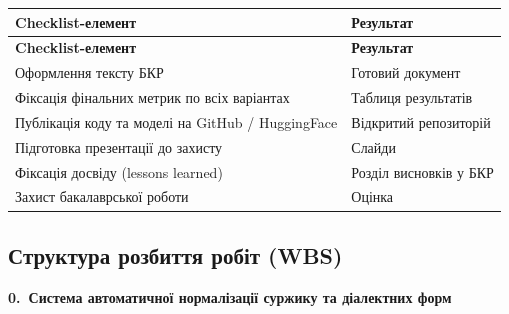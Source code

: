 \documentclass[14pt]{extarticle}
\newcommand{\tabhead}[1]{\textbf{#1}}
\begin{document}
\begin{longtable}{|p{}|p{}|}
\hline
\tabhead{Checklist-елемент} & \tabhead{Результат} \\
\hline
\endfirsthead
\hline
\tabhead{Checklist-елемент} & \tabhead{Результат} \\
\hline
\endhead
Оформлення тексту БКР & Готовий документ \\
\hline
Фіксація фінальних метрик по всіх варіантах & Таблиця результатів \\
\hline
Публікація коду та моделі на GitHub / HuggingFace & Відкритий репозиторій \\
\hline
Підготовка презентації до захисту & Слайди \\
\hline
Фіксація досвіду (lessons learned) & Розділ висновків у БКР \\
\hline
Захист бакалаврської роботи & Оцінка \\
\hline
\end{longtable}

\subsection{Структура розбиття робіт (WBS)}

\noindent\textbf{0.\ Система автоматичної нормалізації суржику та діалектних форм}
\end{document}
